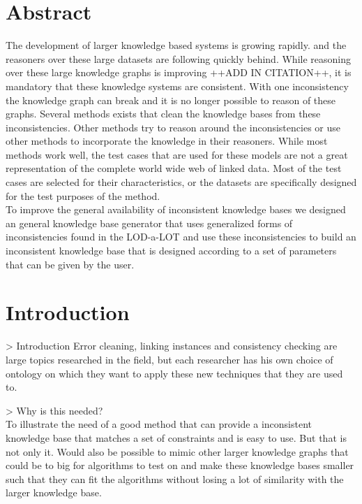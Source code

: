 \documentclass{article}
\begin{document}
\section*{Abstract}
The development of larger knowledge based systems is growing rapidly. and the reasoners over these large datasets are following quickly behind. While reasoning over these large knowledge graphs is improving ++ADD IN CITATION++, it is mandatory that these knowledge systems are consistent. With one inconsistency the knowledge graph can break and it is no longer possible to reason of these graphs. Several methods exists that clean the knowledge bases from these inconsistencies. Other methods try to reason around the inconsistencies or use other methods to incorporate the knowledge in their reasoners. While most methods work well, the test cases that are used for these models are not a great representation of the complete world wide web of linked data. Most of the test cases are selected for their characteristics, or the datasets are specifically designed for the test purposes of the method.\\
To improve the general availability of inconsistent knowledge bases we designed an general knowledge base generator that uses generalized forms of inconsistencies found in the LOD-a-LOT \cite{JavierD:2017} and use these inconsistencies to build an inconsistent knowledge base that is designed according to a set of parameters that can be given by the user.\\


\newpage
\tableofcontents
\newpage
{}

\section{Introduction}
> Introduction
Error cleaning, linking instances and consistency checking are large topics researched in the field, but each researcher has his own choice of ontology on which they want to apply these new techniques that they are used to. 

> Why is this needed?\\
To illustrate the need of a good method that can provide a inconsistent knowledge base that matches a set of constraints and is easy to use. But that is not only it. Would also be possible to mimic other larger knowledge graphs that could be to big for algorithms to test on and make these knowledge bases smaller such that they can fit the algorithms without losing a lot of similarity with the larger knowledge base. \\
\end{document}
